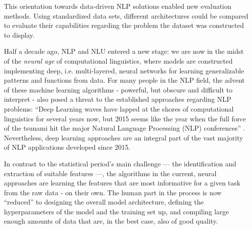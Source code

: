 
This orientation towards data-driven NLP solutions enabled new evaluation methods.
Using standardized data sets, different architectures could be compared to evaluate
their capabilities regarding the problem the dataset was constructed to display.

Half a decade ago, NLP and NLU entered a new stage: we are
now in the midst of the \emph{neural age} of computational
linguistics, where models are constructed implementing
deep, i.e. multi-layered, neural networks for learning
generalizable patterns and functions from data. For many
people in the NLP field, the advent of these machine learning
algorithms - powerful, but obscure and difficult to interpret
- also posed a threat to the established approaches regarding
NLP problems: ``Deep Learning waves have lapped at the shores
of computational linguistics for several years now, but 2015
seems like the year when the full force of the tsunami hit
the major Natural Language Processing (NLP) conferences''
\citep[p.~701]{manning2015computational}. Nevertheless, deep
learning approaches are an integral part of the vast majority
of NLP applications developed since 2015.

In contrast to the statistical period's main challenge --- the identification
and extraction of suitable features ---, the algorithms in the current, neural
approaches are learning the features that are most informative for a given task
from the raw data - on their own. The human part in the
process is now ``reduced'' to designing the overall model architecture, defining the
hyperparameters of the model and the training set up, and compiling large enough
amounts of data that are, in the best case, also of good quality.

